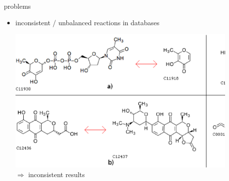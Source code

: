 \documentclass[style=ufz]{powerdot}
\newcommand{\magic}{transmutational} %
\newcommand{\indistinct}{indistinct}
\begin{document}
\begin{slide}{problems}
\begin{itemize}
  \pause\item inconsistent / unbalanced reactions in databases\newline
  \pause  \includegraphics[width=0.9\textwidth]{examples.ps}\\ \pause
  $\Rightarrow$ inconsistent results
\end{itemize}
\end{slide}
\newcommand{\fordataset}{\foreach \Num/\description/\color/\pattern in {
	\the\lastbalanced / balanced \\	reactions:\\	/green/north east lines,
	 \the\lastindistinctive / \indistinct\ reactions:\\/yellow/north west lines,
	\the\lastunbalanced / unbalanced\slash\magic\\reactions:/orange/dots,
	 \the\lastmagic / \magic \\reactions:		/red/vertical lines}
}
\end{document}
